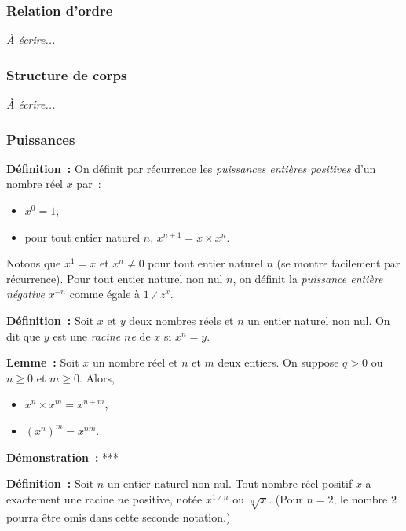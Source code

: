 \subsubsection{Relation d'ordre}

\emph{À écrire...}

\subsubsection{Structure de corps}

\emph{À écrire...}

\subsubsection{Puissances}

\noindent\textbf{Définition :} On définit par récurrence les \emph{puissances entières positives} d'un nombre réel $x$ par :
    \begin{itemize}[nosep]
        \item $x^0 = 1$,
        \item pour tout entier naturel $n$, $x^{n+1} = x \times x^n$.
    \end{itemize}
    Notons que $x^1 = x$ et $x^n \neq 0$ pour tout entier naturel $n$ (se montre facilement par récurrence).
    Pour tout entier naturel non nul $n$, on définit la \emph{puissance entière négative} $x^{-n}$ comme égale à $1 \divslash z^x$.

\medskip

\noindent\textbf{Définition :} Soit $x$ et $y$ deux nombres réels et $n$ un entier naturel non nul.
    On dit que $y$ est une \emph{racine $n$e} de $x$ si $x^n = y$.

\medskip

\noindent\textbf{Lemme :} Soit $x$ un nombre réel et $n$ et $m$ deux entiers. 
    On suppose $q > 0$ ou $n \geq 0$ et $m \geq 0$.
    Alors, 
    \begin{itemize}[nosep]
        \item $x^n \times x^m = x^{n+m}$,
        \item $(x^n)^m = x^{n m}$.
    \end{itemize}

\medskip

\noindent\textbf{Démonstration :} ***

\medskip

\noindent\textbf{Définition :} Soit $n$ un entier naturel non nul. 
    Tout nombre réel positif $x$ a exactement une racine $n$e positive, notée $x^{1 \divslash n}$ ou $\sqrt[n]{x}$.
    (Pour $n = 2$, le nombre $2$ pourra être omis dans cette seconde notation.)

